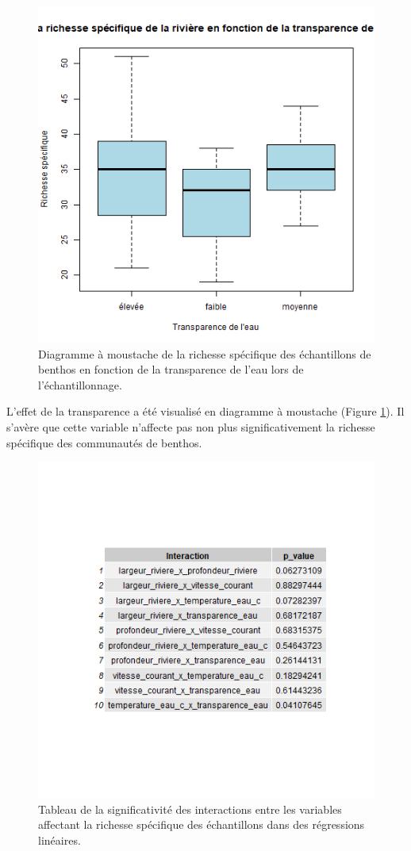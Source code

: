 \documentclass[9pt,twocolumn,twoside,]{pnas-new}
\begin{document}
\begin{figure}
\centering
\includegraphics{boxplot_richesse.png}
\caption{Diagramme à moustache de la richesse spécifique des
échantillons de benthos en fonction de la transparence de l'eau lors de
l'échantillonnage. \label{fig:boxplot_richesse}}
\end{figure}

L'effet de la transparence a été visualisé en diagramme à moustache
(Figure \ref{fig:boxplot_richesse}). Il s'avère que cette variable
n'affecte pas non plus significativement la richesse spécifique des
communautés de benthos.

\begin{figure}
\centering
\includegraphics{tableau_interaction.png}
\caption{Tableau de la significativité des interactions entre les
variables affectant la richesse spécifique des échantillons dans des
régressions linéaires. \label{fig:tableau_interaction}}
\end{figure}
\end{document}
